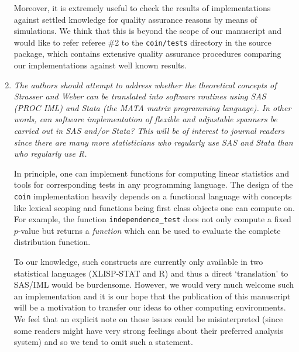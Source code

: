 \documentclass[11pt]{article}
\begin{document}
\begin{enumerate}
Moreover, it is extremely useful to check the results of implementations
against settled knowledge for quality assurance reasons by means of
simulations. We
think that this is beyond the scope of our manuscript and would like to
refer referee \#2 to the \texttt{coin/tests} directory in the source
package, which contains extensive quality assurance procedures comparing our
implementations against well known results.

\item \textsl{The authors should attempt to address whether the theoretical concepts of
              Strasser and Weber can be translated into software routines using 
              SAS (PROC IML) and Stata (the MATA matrix programming language). In other 
              words, can software implementation of flexible and adjustable
              spanners be carried out in SAS and/or Stata? This will be of interest to
              journal readers since there are many more statisticians who regularly use 
              SAS and Stata than who regularly use R.}

In principle, one can implement functions for computing linear statistics
and tools for corresponding tests in any programming language. The design of
the \texttt{coin} implementation heavily depends on a functional language 
with concepts like lexical
scoping and functions being first class objects one can compute on. For
example, the function \texttt{independence\_test} does not only compute a
fixed $p$-value but returns a \textit{function} which can be used to
evaluate the complete distribution function.

To our knowledge, such constructs are currently only available in two
statistical languages (\textsf{XLISP-STAT} and \textsf{R}) and thus a direct
`translation' to \textsf{SAS/IML} would be burdensome. However, we would
very much welcome such an implementation and it is our hope that the
publication of this manuscript will be a motivation to transfer our ideas
to other computing environments. We feel that an explicit note on those
issues could be misinterpreted (since some readers might have very strong 
feelings about their preferred analysis system) and so we tend to omit 
such a statement.

\end{enumerate}
\end{document}
